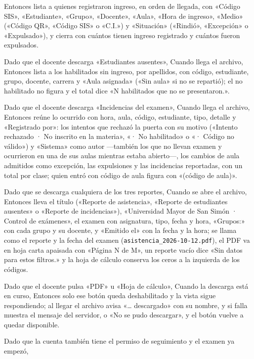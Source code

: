 {      Entonces lista a quienes registraron ingreso, en orden de llegada, con «Código
      SIS», «Estudiante», «Grupo», «Docente», «Aula», «Hora de ingreso», «Medio» («Código QR»,
      «Código SIS» o «C.I.») y «Situación» («Rindió», «Excepción» o «Expulsado»), y
      cierra con cuántos tienen ingreso registrado y cuántos fueron expulsados.
\item Dado que el docente descarga «Estudiantes ausentes», Cuando llega el archivo,
      Entonces lista a los habilitados sin ingreso, por apellidos, con código,
      estudiante, grupo, docente, carrera y «Aula asignada» («Sin aula» si no se repartió); el no
      habilitado no figura y el total dice «N habilitados que no se presentaron.».
\item Dado que el docente descarga «Incidencias del examen», Cuando llega el archivo,
      Entonces reúne lo ocurrido con hora, aula, código, estudiante, tipo, detalle y
      «Registrado por»: los intentos que rechazó la puerta con su motivo («Intento
      rechazado · No inscrito en la materia», «· No habilitado» o «· Código no válido»)
      y «Sistema» como autor ---también los que no llevan examen y ocurrieron en una de
      sus aulas mientras estaba abierto---, los cambios de aula admitidos como
      excepción, las expulsiones y las incidencias reportadas, con un total por clase;
      quien entró con código de aula figura con «(código de aula)».
\item Dado que se descarga cualquiera de los tres reportes, Cuando se abre el archivo,
      Entonces lleva el título («Reporte de asistencia», «Reporte de estudiantes
      ausentes» o «Reporte de incidencias»), «Universidad Mayor de San Simón · Control
      de exámenes», el examen con asignatura, tipo, fecha y hora, «Grupos:» con cada
      grupo y su docente, y «Emitido el» con la fecha y la hora; se llama como el reporte y la fecha del examen
      (\texttt{asistencia\_2026-10-12.pdf}), el PDF va en hoja carta apaisada con
      «Página N de M», un reporte vacío dice «Sin datos para estos filtros.» y la hoja
      de cálculo conserva los ceros a la izquierda de los códigos.
\item Dado que el docente pulsa «PDF» u «Hoja de cálculo», Cuando la descarga está en
      curso, Entonces solo ese botón queda deshabilitado y la vista sigue respondiendo;
      al llegar el archivo avisa «\ldots{} descargado» con su nombre, y si falla muestra
      el mensaje del servidor, o «No se pudo descargar», y el botón vuelve a quedar
      disponible.
\item Dado que la cuenta también tiene el permiso de seguimiento y el examen ya empezó,
}
